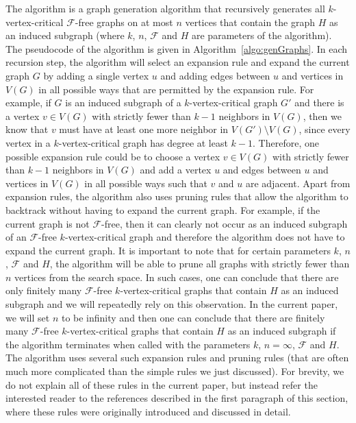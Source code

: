 \documentclass[11pt,a4paper]{article}
\theoremstyle{definition}
\begin{document}
The algorithm is a graph generation algorithm that recursively generates all $k$-vertex-critical $\mathcal{F}$-free graphs on at most $n$ vertices that contain the graph $H$ as an induced subgraph (where $k$, $n$, $\mathcal{F}$ and $H$ are parameters of the algorithm). The pseudocode of the algorithm is given in Algorithm~\ref{algo:genGraphs}. In each recursion step, the algorithm will select an expansion rule and expand the current graph $G$ by adding a single vertex $u$ and adding edges between $u$ and vertices in $V(G)$ in all possible ways that are permitted by the expansion rule. For example, if $G$ is an induced subgraph of a $k$-vertex-critical graph $G'$ and there is a vertex $v \in V(G)$ with strictly fewer than $k-1$ neighbors in $V(G)$, then we know that $v$ must have at least one more neighbor in $V(G') \setminus V(G)$, since every vertex in a $k$-vertex-critical graph has degree at least $k-1$. Therefore, one possible expansion rule could be to choose a vertex $v \in V(G)$ with strictly fewer than $k-1$ neighbors in $V(G)$ and add a vertex $u$ and edges between $u$ and vertices in $V(G)$ in all possible ways such that $v$ and $u$ are adjacent. Apart from expansion rules, the algorithm also uses pruning rules that allow the algorithm to backtrack without having to expand the current graph. For example, if the current graph is not $\mathcal{F}$-free, then it can clearly not occur as an induced subgraph of an $\mathcal{F}$-free $k$-vertex-critical graph and therefore the algorithm does not have to expand the current graph. It is important to note that for certain parameters $k$, $n$, $\mathcal{F}$ and $H$, the algorithm will be able to prune all graphs with strictly fewer than $n$ vertices from the search space. In such cases, one can conclude that there are only finitely many $\mathcal{F}$-free $k$-vertex-critical graphs that contain $H$ as an induced subgraph and we will repeatedly rely on this observation. In the current paper, we will set $n$ to be infinity and then one can conclude that there are finitely many $\mathcal{F}$-free $k$-vertex-critical graphs that contain $H$ as an induced subgraph if the algorithm terminates when called with the parameters $k$, $n=\infty$, $\mathcal{F}$ and $H$. The algorithm uses several such expansion rules and pruning rules (that are often much more complicated than the simple rules we just discussed). For brevity, we do not explain all of these rules in the current paper, but instead refer the interested reader to the references described in the first paragraph of this section, where these rules were originally introduced and discussed in detail.
\end{document}
